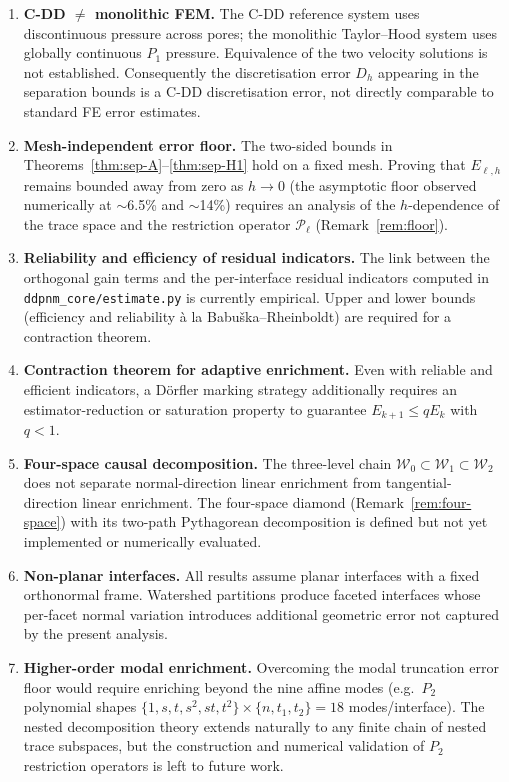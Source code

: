 \documentclass[11pt,a4paper]{article}
\theoremstyle{definition}
\newcommand{\Wspace}{\mathcal{W}}
\newcommand{\Pcal}{\mathcal{P}}
\begin{document}
\begin{enumerate}[leftmargin=*,itemsep=4pt]
  \item \textbf{C-DD $\neq$ monolithic FEM.}
    The C-DD reference system uses discontinuous pressure across
    pores; the monolithic Taylor--Hood system uses globally
    continuous $P_1$ pressure.  Equivalence of the two velocity
    solutions is not established.  Consequently the discretisation
    error $D_h$ appearing in the separation bounds is a C-DD
    discretisation error, not directly comparable to standard FE
    error estimates.
  \item \textbf{Mesh-independent error floor.}
    The two-sided bounds in Theorems~\ref{thm:sep-A}--\ref{thm:sep-H1}
    hold on a fixed mesh.  Proving that $E_{\ell,h}$ remains bounded
    away from zero as $h\to 0$ (the asymptotic floor observed
    numerically at $\sim$6.5\% and $\sim$14\%) requires an analysis of
    the $h$-dependence of the trace space and the restriction operator
    $\Pcal_\ell$ (Remark~\ref{rem:floor}).
  \item \textbf{Reliability and efficiency of residual indicators.}
    The link between the orthogonal gain terms and the per-interface
    residual indicators computed in \texttt{ddpnm\_core/estimate.py}
    is currently empirical.  Upper and lower bounds (efficiency and
    reliability \`a la Babu\v{s}ka--Rheinboldt) are required for a
    contraction theorem.
  \item \textbf{Contraction theorem for adaptive enrichment.}
    Even with reliable and efficient indicators, a D\"orfler marking
    strategy additionally requires an estimator-reduction or saturation
    property to guarantee $E_{k+1}\le q E_k$ with $q<1$.
  \item \textbf{Four-space causal decomposition.}
    The three-level chain $\Wspace_0\subset\Wspace_1\subset\Wspace_2$
    does not separate normal-direction linear enrichment from
    tangential-direction linear enrichment.  The four-space diamond
    (Remark~\ref{rem:four-space}) with its two-path Pythagorean
    decomposition is defined but not yet implemented or numerically
    evaluated.
  \item \textbf{Non-planar interfaces.}
    All results assume planar interfaces with a fixed orthonormal
    frame.  Watershed partitions produce faceted interfaces whose
    per-facet normal variation introduces additional geometric error
    not captured by the present analysis.
  \item \textbf{Higher-order modal enrichment.}
    Overcoming the modal truncation error floor would require enriching
    beyond the nine affine modes (e.g.\ $P_2$ polynomial shapes
    $\{1,s,t,s^2,st,t^2\}\times\{n,t_1,t_2\}=18$ modes/interface).
    The nested decomposition theory extends naturally to any finite
    chain of nested trace subspaces, but the construction and numerical
    validation of $P_2$ restriction operators is left to future work.
\end{enumerate}
\end{document}
